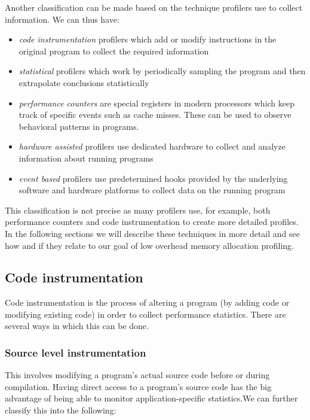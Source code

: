 Another classification can be made based on the technique profilers use to collect information. We can thus have:
\begin{itemize}
\item \textit{code instrumentation} profilers which add or modify instructions in the original program to collect the required information
\item \textit{statistical} profilers which work by periodically sampling the program and then extrapolate conclusions statistically
\item \textit{performance counters} are special registers in modern processors which keep track of specific events such as cache misses. These can be used to observe behavioral patterns in programs.
\item \textit{hardware assisted} profilers use dedicated hardware to collect and analyze information about running programs
\item \textit{event based} profilers use predetermined hooks provided by the underlying software and hardware platforms to collect data on the running program
\end{itemize}

This classification is not precise as many profilers use, for example, both performance counters and code instrumentation to create more detailed profiles. In the following sections we will describe these techniques in more detail and see how and if they relate to our goal of low overhead memory allocation profiling.



\subsection{Code instrumentation}
\label{subsection:codeinstrumentation}

Code instrumentation is the process of altering a program (by adding code or modifying existing code) in order to collect performance statistics. There are several ways in which this can be done.

\subsubsection{Source level instrumentation}
This involves modifying a program's actual source code before or during compilation. Having direct access to a program's source code has the big advantage of being able to monitor application-specific statistics.We can further classify this into the following:


